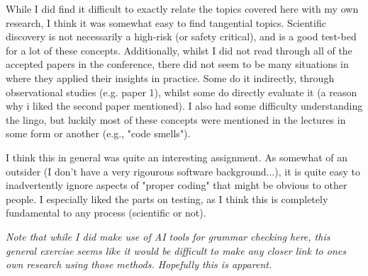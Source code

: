 \documentclass[11pt,compsoc,a4paper]{IEEEtran}
\begin{document}
While I did find it difficult to exactly relate the topics covered here with my own research, I think it was somewhat easy to find tangential topics. Scientific discovery is not necessarily a high-risk (or safety critical), and is a good test-bed for a lot of these concepts. Additionally, whilst I did not read through all of the accepted papers in the conference, there did not seem to be many situations in where they applied their insights in practice. Some do it indirectly, through observational studies (e.g. paper 1), whilst some do directly evaluate it (a reason why i liked the second paper mentioned). I also had some difficulty understanding the lingo, but luckily most of these concepts were mentioned in the lectures in some form or another (e.g., "code smells").

I think this in general was quite an interesting assignment. As somewhat of an outsider (I don't have a very rigourous software background...), it is quite easy to inadvertently ignore aspects of "proper coding" that might be obvious to other people.  I especially liked the parts on testing, as I think this is completely fundamental to any process (scientific or not).

\vspace{0.5cm}

\noindent \textit{Note that while I did make use of AI tools for grammar checking here, this general exercise seems like it would be difficult to make any closer link to ones own research using those methods. Hopefully this is apparent. }


\end{document}
